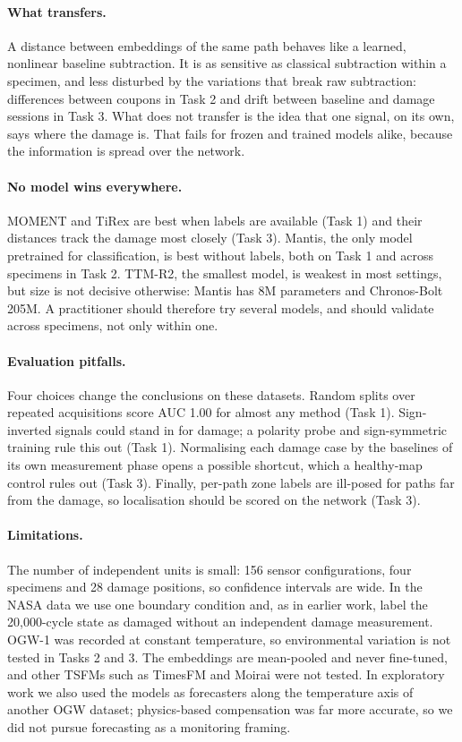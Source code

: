 \documentclass{article}
\begin{document}
\paragraph{What transfers.}
A distance between embeddings of the same path behaves like a learned, nonlinear baseline subtraction. It
is as sensitive as classical subtraction within a specimen, and less disturbed by the variations that break
raw subtraction: differences between coupons in Task 2 and drift between baseline and damage sessions in
Task 3. What does not transfer is the idea that one signal, on its own, says where the damage is. That
fails for frozen and trained models alike, because the information is spread over the network.

\paragraph{No model wins everywhere.}
MOMENT and TiRex are best when labels are available (Task 1) and their distances track the damage most
closely (Task 3). Mantis, the only model pretrained for classification, is best without labels, both on
Task 1 and across specimens in Task 2. TTM-R2, the smallest model, is weakest in most settings, but size is
not decisive otherwise: Mantis has 8M parameters and Chronos-Bolt 205M. A practitioner should therefore
try several models, and should validate across specimens, not only within one.

\paragraph{Evaluation pitfalls.}
\label{sec:pitfalls}
Four choices change the conclusions on these datasets. Random splits over repeated acquisitions score AUC
1.00 for almost any method (Task 1). Sign-inverted signals could stand in for damage; a polarity probe and
sign-symmetric training rule this out (Task 1). Normalising each damage case by the baselines of its own
measurement phase opens a possible shortcut, which a healthy-map control rules out (Task 3). Finally,
per-path zone labels are ill-posed for paths far from the damage, so localisation should be scored on the
network (Task 3).

\paragraph{Limitations.}
The number of independent units is small: 156 sensor configurations, four specimens and 28 damage
positions, so confidence intervals are wide. In the NASA data we use one boundary condition and, as in
earlier work, label the 20{,}000-cycle state as damaged without an independent damage measurement. OGW-1
was recorded at constant temperature, so environmental variation is not tested in Tasks 2 and 3. The
embeddings are mean-pooled and never fine-tuned, and other TSFMs such as TimesFM and Moirai were not
tested. In exploratory work we also used the models as forecasters along the temperature axis of another
OGW dataset; physics-based compensation was far more accurate, so we did not pursue forecasting as a
monitoring framing.
\end{document}
